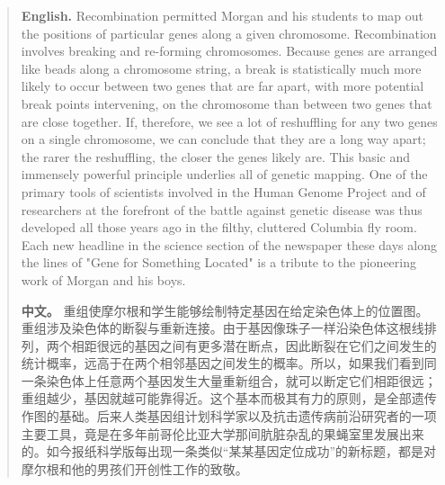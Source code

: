 \begin{quote}
\noindent\textbf{English.} Recombination permitted Morgan and his students to map out the positions of particular genes along a given chromosome. Recombination involves breaking and re-forming chromosomes. Because genes are arranged like beads along a chromosome string, a break is statistically much more likely to occur between two genes that are far apart, with more potential break points intervening, on the chromosome than between two genes that are close together. If, therefore, we see a lot of reshuffling for any two genes on a single chromosome, we can conclude that they are a long way apart; the rarer the reshuffling, the closer the genes likely are. This basic and immensely powerful principle underlies all of genetic mapping. One of the primary tools of scientists involved in the Human Genome Project and of researchers at the forefront of the battle against genetic disease was thus developed all those years ago in the filthy, cluttered Columbia fly room. Each new headline in the science section of the newspaper these days along the lines of "Gene for Something Located" is a tribute to the pioneering work of Morgan and his boys.

\smallskip
\noindent\textbf{中文。} 重组使摩尔根和学生能够绘制特定基因在给定染色体上的位置图。重组涉及染色体的断裂与重新连接。由于基因像珠子一样沿染色体这根线排列，两个相距很远的基因之间有更多潜在断点，因此断裂在它们之间发生的统计概率，远高于在两个相邻基因之间发生的概率。所以，如果我们看到同一条染色体上任意两个基因发生大量重新组合，就可以断定它们相距很远；重组越少，基因就越可能靠得近。这个基本而极其有力的原则，是全部遗传作图的基础。后来人类基因组计划科学家以及抗击遗传病前沿研究者的一项主要工具，竟是在多年前哥伦比亚大学那间肮脏杂乱的果蝇室里发展出来的。如今报纸科学版每出现一条类似“某某基因定位成功”的新标题，都是对摩尔根和他的男孩们开创性工作的致敬。
\end{quote}

